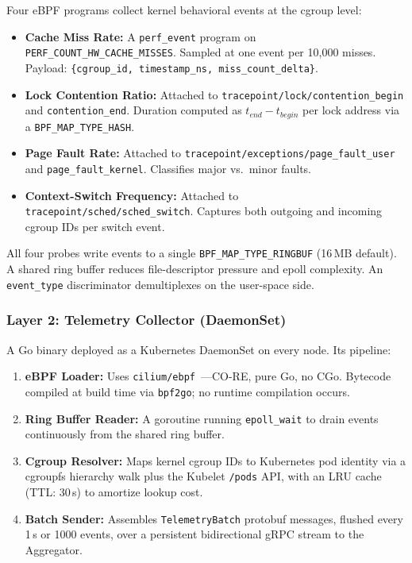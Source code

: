 \documentclass[10pt,conference,a4paper]{IEEEtran}
\begin{document}
Four eBPF programs collect kernel behavioral events at the cgroup level:

\begin{itemize}[leftmargin=*,topsep=1pt,itemsep=1pt]
  \item \textbf{Cache Miss Rate:} A \texttt{perf\_event} program on
        \texttt{PERF\_COUNT\_HW\_CACHE\_MISSES}. Sampled at one event per 10,000
        misses. Payload: \texttt{\{cgroup\_id, timestamp\_ns, miss\_count\_delta\}}.
  \item \textbf{Lock Contention Ratio:} Attached to
        \texttt{tracepoint/lock/contention\_begin} and \texttt{contention\_end}.
        Duration computed as $t_{end} - t_{begin}$ per lock address via a
        \texttt{BPF\_MAP\_TYPE\_HASH}.
  \item \textbf{Page Fault Rate:} Attached to
        \texttt{tracepoint/exceptions/page\_fault\_user} and
        \texttt{page\_fault\_kernel}. Classifies major vs.\ minor faults.
  \item \textbf{Context-Switch Frequency:} Attached to
        \texttt{tracepoint/sched/sched\_switch}. Captures both outgoing and
        incoming cgroup IDs per switch event.
\end{itemize}

All four probes write events to a single \texttt{BPF\_MAP\_TYPE\_RINGBUF} (16\,MB
default). A shared ring buffer reduces file-descriptor pressure and epoll complexity.
An \texttt{event\_type} discriminator demultiplexes on the user-space side.

\subsubsection{Layer 2: Telemetry Collector (DaemonSet)}

A Go binary deployed as a Kubernetes DaemonSet on every node. Its pipeline:

\begin{enumerate}[leftmargin=*,topsep=1pt,itemsep=1pt]
  \item \textbf{eBPF Loader:} Uses \texttt{cilium/ebpf}~\cite{cilium_ebpf}---CO-RE,
        pure Go, no CGo. Bytecode compiled at build time via \texttt{bpf2go};
        no runtime compilation occurs.
  \item \textbf{Ring Buffer Reader:} A goroutine running \texttt{epoll\_wait} to
        drain events continuously from the shared ring buffer.
  \item \textbf{Cgroup Resolver:} Maps kernel cgroup IDs to Kubernetes pod identity
        via a cgroupfs hierarchy walk plus the Kubelet \texttt{/pods} API, with an
        LRU cache (TTL: 30\,s) to amortize lookup cost.
  \item \textbf{Batch Sender:} Assembles \texttt{TelemetryBatch} protobuf messages,
        flushed every 1\,s or 1000 events, over a persistent bidirectional gRPC
        stream to the Aggregator.
\end{enumerate}
\end{document}
